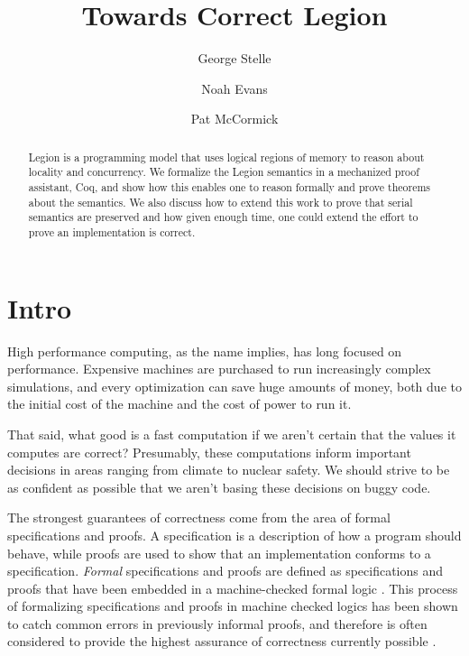 \documentclass[sigconf]{acmart}
\begin{document}
\title{Towards Correct Legion}
\author{George Stelle}

\author{Noah Evans}

\author{Pat McCormick}

\begin{abstract}
Legion is a programming model that uses logical regions of memory to reason about 
locality and concurrency. We formalize the Legion semantics in a mechanized
proof assistant, Coq, and show how this enables one to reason formally and
prove theorems about the semantics. We also discuss how to extend this work to
prove that serial semantics are preserved and how given enough time, one could
extend the effort to prove an implementation is correct.
\end{abstract}

\maketitle

\section{Intro}
High performance computing, as the name implies, has long focused on
performance. Expensive machines are purchased to run increasingly complex
simulations, and every optimization can save huge amounts of money, both due to
the initial cost of the machine and the cost of power to run it. 

That said, what good is a fast computation if we aren't certain that the
values it computes are correct? Presumably, these computations inform important
decisions in areas ranging from climate to nuclear safety. We should strive to
be as confident as possible that we aren't basing these decisions on buggy
code.

The strongest guarantees of correctness come from the area of formal
specifications and proofs. A specification is a description of how a program
should behave, while proofs are used to show that an implementation conforms to
a specification. \emph{Formal} specifications and proofs are defined as
specifications and proofs that have been embedded in a machine-checked formal
logic \cite{bertot2013interactive, nipkow2002isabelle, pfenning1999system,
jackson1994nuprl}. This process of formalizing specifications and proofs in
machine checked logics has been shown to catch common errors in previously
informal proofs, and therefore is often considered to provide the highest
assurance of correctness currently possible \cite{clarke1996formal,
yang2011finding}.
\end{document}
